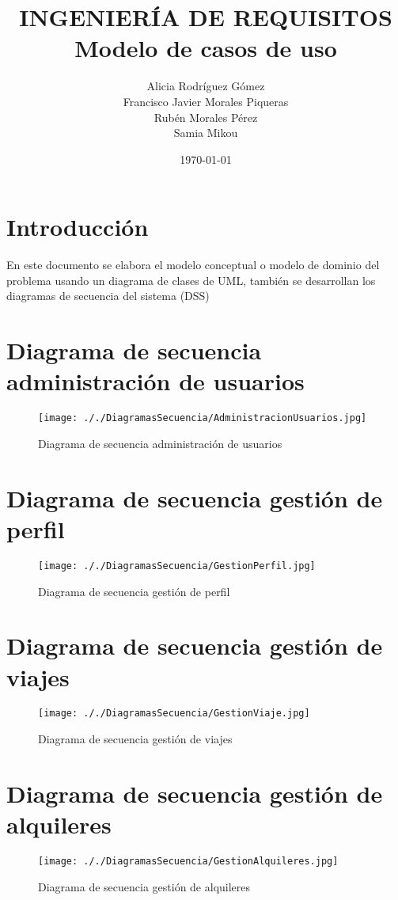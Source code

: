 \documentclass[11pt,spanish]{article} %
\title{INGENIERÍA DE REQUISITOS \\
	Modelo de casos de uso}
\author{Alicia Rodríguez Gómez \\
	Francisco Javier Morales Piqueras \\
	Rubén Morales Pérez \\
	Samia Mikou}
\date{\today}
\begin{document}
\maketitle
\tableofcontents %
\setlength\parindent{0pt} %
\newpage 

\vspace{5cm}
\section{Introducción}
En este documento se elabora el modelo conceptual o modelo de dominio del problema usando un diagrama de clases de UML, también se desarrollan los diagramas de secuencia del sistema (DSS)


\section{Diagrama de secuencia administración de usuarios}

\begin{figure}[H]
	\centering
	\label{AdministracionUsuarios}
	\texttt{[image: ././DiagramasSecuencia/AdministracionUsuarios.jpg]}
	\caption{Diagrama de secuencia administración de usuarios}
\end{figure}
\section{Diagrama de secuencia gestión de perfil}
\begin{figure}[H]
	\centering
	\label{GestionPerfil}
	\texttt{[image: ././DiagramasSecuencia/GestionPerfil.jpg]}
	\caption{Diagrama de secuencia gestión de perfil}
\end{figure}


\section{Diagrama de secuencia gestión de viajes}
\begin{figure}[H]
	\centering
	\label{GestionViaje}
	\texttt{[image: ././DiagramasSecuencia/GestionViaje.jpg]}
	\caption{Diagrama de secuencia gestión de viajes}
\end{figure}

\section{Diagrama de secuencia gestión de alquileres}
\begin{figure}[H]
	\centering
	\label{GestionAlquileres}
	\texttt{[image: ././DiagramasSecuencia/GestionAlquileres.jpg]}
	\caption{Diagrama de secuencia gestión de alquileres}
\end{figure}
\end{document}
